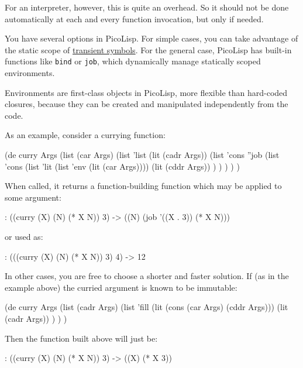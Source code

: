 For an interpreter, however, this is quite an overhead. So it should not
be done automatically at each and every function invocation, but only if
needed.

You have several options in PicoLisp. For simple cases, you can take
advantage of the static scope of \hyperref[ref.html-transient-io]{transient symbols}. For the general case, PicoLisp has built-in functions like
\texttt{bind} or \texttt{job}, which dynamically manage statically scoped
environments.

Environments are first-class objects in PicoLisp, more flexible than
hard-coded closures, because they can be created and manipulated
independently from the code.

As an example, consider a currying function:


\begin{wideverbatim}
(de curry Args
   (list (car Args)
      (list 'list
         (lit (cadr Args))
         (list 'cons ''job
            (list 'cons
               (list 'lit (list 'env (lit (car Args))))
               (lit (cddr Args)) ) ) ) ) )
\end{wideverbatim}

When called, it returns a function-building function which may be
applied to some argument:


\begin{wideverbatim}
: ((curry (X) (N) (* X N)) 3)
-> ((N) (job '((X . 3)) (* X N)))
\end{wideverbatim}

or used as:


\begin{wideverbatim}
: (((curry (X) (N) (* X N)) 3) 4)
-> 12
\end{wideverbatim}

In other cases, you are free to choose a shorter and faster solution. If
(as in the example above) the curried argument is known to be immutable:


\begin{wideverbatim}
(de curry Args
   (list
      (cadr Args)
      (list 'fill
         (lit (cons (car Args) (cddr Args)))
         (lit (cadr Args)) ) ) )
\end{wideverbatim}

Then the function built above will just be:


\begin{wideverbatim}
: ((curry (X) (N) (* X N)) 3)
-> ((X) (* X 3))
\end{wideverbatim}

